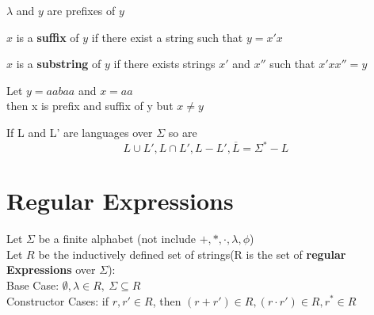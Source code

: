 \documentclass{aq-notes}
\begin{document}
    \begin{example}
        $\lambda$ and $y$ are prefixes of $y$
    \end{example}

    \begin{definition}[Suffix]
        $x$ is a {\bf suffix} of $y$ if there exist a string such that $y = x'x$
    \end{definition}

    \begin{definition}[Substring]
        $x$ is a {\bf substring} of $y$ if there exists strings $x'$ and $x''$ such that $x' xx'' = y$
    \end{definition}

    \begin{example}
        Let $y = aabaa$ and $x=aa$\\
        then x is prefix and suffix of y but $x \neq y$
    \end{example}


    \begin{definition}
        If L and L' are languages over $\Sigma$ so are
        \[L\cup L', L\cap L', L-L', \overline{L} = \Sigma^* - L\] 
    \end{definition}


\newpage

\section{Regular Expressions}

    \begin{definition}
        Let $\Sigma$ be a finite alphabet (not include $+, *,\cdot, \lambda, \phi$)\\
        Let $R$ be the inductively defined set of strings(R is the set of {\bf regular Expressions} over $\Sigma$):\vspace{1ex}\\
        Base Case: $\emptyset, \lambda \in R,\ \Sigma \subseteq R$\\
        Constructor Cases: if $r,r'\in R$, then $(r+r')\in R, (r\cdot r')\in R, r^*\in R$
    \end{definition}
\end{document}

